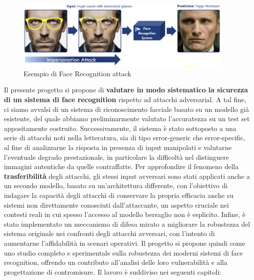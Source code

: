     \begin{figure}[H]
        \centering
        \includegraphics[width=0.95\textwidth]{images/impersonation_attack.png}
        \caption{Esempio di Face Recognition attack}
    \end{figure}

    \noindent Il presente progetto si propone di \textbf{valutare in modo sistematico la sicurezza di un sistema di face recognition} rispetto ad attacchi adversarial. A tal fine, ci siamo avvalsi di un sistema di riconoscimento facciale basato su un modello già esistente, del quale abbiamo preliminarmente valutato l’accuratezza su un test set appositamente costruito. Successivamente, il sistema è stato sottoposto a una serie di attacchi noti nella letteratura, sia di tipo error-generic che error-specific, al fine di analizzarne la risposta in presenza di input manipolati e valutarne l’eventuale degrado prestazionale, in particolare la difficoltà nel distinguere immagini autentiche da quelle contraffatte.
    Per approfondire il fenomeno della \textbf{trasferibilità} degli attacchi, gli stessi input avversari sono stati applicati anche a un secondo modello, basato su un’architettura differente, con l’obiettivo di indagare la capacità degli attacchi di conservare la propria efficacia anche su sistemi non direttamente conosciuti dall’attaccante, un aspetto cruciale nei contesti reali in cui spesso l’accesso al modello bersaglio non è esplicito.
    Infine, è stato implementato un meccanismo di difesa mirato a migliorare la robustezza del sistema originale nei confronti degli attacchi avversari, con l’intento di aumentarne l’affidabilità in scenari operativi.
    Il progetto si propone quindi come uno studio completo e sperimentale sulla robustezza dei moderni sistemi di face recognition, offrendo un contributo all’analisi delle loro vulnerabilità e alla progettazione di contromisure.
    Il lavoro è suddiviso nei seguenti capitoli:
